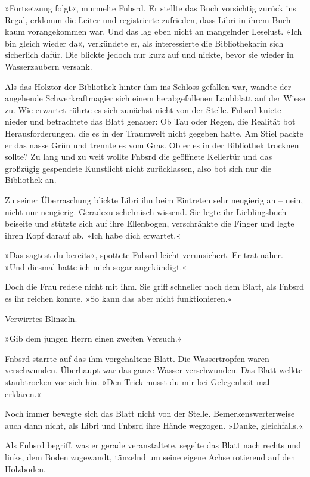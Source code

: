 »Fortsetzung folgt«, murmelte Fnbsrd. Er stellte das Buch vorsichtig zurück ins Regal, erklomm die Leiter und registrierte zufrieden, dass Libri in ihrem Buch kaum vorangekommen war. Und das lag eben nicht an mangelnder Leselust. »Ich bin gleich wieder da«, verkündete er, als interessierte die Bibliothekarin sich sicherlich dafür. Die blickte jedoch nur kurz auf und nickte, bevor sie wieder in Wasserzaubern versank.

Als das Holztor der Bibliothek hinter ihm ins Schloss gefallen war, wandte der angehende Schwerkraftmagier sich einem herabgefallenen Laubblatt auf der Wiese zu. Wie erwartet rührte es sich zunächst nicht von der Stelle. Fnbsrd kniete nieder und betrachtete das Blatt genauer: Ob Tau oder Regen, die Realität bot Herausforderungen, die es in der Traumwelt nicht gegeben hatte. Am Stiel packte er das nasse Grün und trennte es vom Gras. Ob er es in der Bibliothek trocknen sollte? Zu lang und zu weit wollte Fnbsrd die geöffnete Kellertür und das großzügig gespendete Kunstlicht nicht zurücklassen, also bot sich nur die Bibliothek an.

Zu seiner Überraschung blickte Libri ihn beim Eintreten sehr neugierig an – nein, nicht nur neugierig. Geradezu schelmisch wissend. Sie legte ihr Lieblingsbuch beiseite und stützte sich auf ihre Ellenbogen, verschränkte die Finger und legte ihren Kopf darauf ab. »Ich habe dich erwartet.«

»Das sagtest du bereits«, spottete Fnbsrd leicht verunsichert. Er trat näher. »Und diesmal hatte ich mich sogar angekündigt.«

Doch die Frau redete nicht mit ihm. Sie griff schneller nach dem Blatt, als Fnbsrd es ihr reichen konnte. »So kann das aber nicht funktionieren.«

Verwirrtes Blinzeln.

»Gib dem jungen Herrn einen zweiten Versuch.«

Fnbsrd starrte auf das ihm vorgehaltene Blatt. Die Wassertropfen waren verschwunden. Überhaupt war das ganze Wasser verschwunden. Das Blatt welkte staubtrocken vor sich hin. »Den Trick musst du mir bei Gelegenheit mal erklären.«

Noch immer bewegte sich das Blatt nicht von der Stelle. Bemerkenswerterweise auch dann nicht, als Libri und Fnbsrd ihre Hände wegzogen. »Danke, gleichfalls.«

Als Fnbsrd begriff, was er gerade veranstaltete, segelte das Blatt nach rechts und links, dem Boden zugewandt, tänzelnd um seine eigene Achse rotierend auf den Holzboden.

